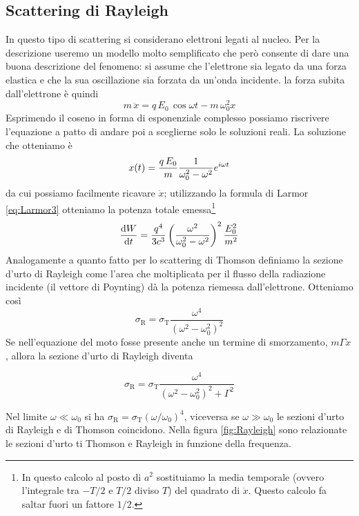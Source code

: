 \subsection{Scattering di Rayleigh}
In questo tipo di scattering si considerano elettroni legati al nucleo. Per la descrizione useremo un modello molto semplificato che però consente di dare una buona descrizione del fenomeno: si assume che l'elettrone sia legato da una forza elastica e che la sua oscillazione sia forzata da un'onda incidente. la forza subita dall'elettrone è quindi
\begin{equation}
m\,\ddot{x} = q\,E_0\,\cos\omega t - m\, \omega_0^2 x
\end{equation}
Esprimendo il coseno in forma di esponenziale complesso possiamo riscrivere l'equazione a patto di andare poi a sceglierne solo le soluzioni reali. La soluzione che otteniamo è
\begin{equation}
x(t) = \dfrac{q\,E_0}{m} \dfrac{1}{\omega_0^2-\omega^2} e^{i\omega t}
\end{equation}
da cui possiamo facilmente ricavare $\ddot{x}$; utilizzando la formula di Larmor \ref{eq:Larmor3} otteniamo la potenza totale emessa\footnote{In questo calcolo al posto di $a^2$ sostituiamo la media temporale (ovvero l'integrale tra $-T/2$ e $T/2$ diviso $T$) del quadrato di $\ddot{x}$. Questo calcolo fa saltar fuori un fattore $1/2$.}
\begin{equation}
\dfrac{\mathrm{d} {W}}{\mathrm{d} {t}} = \dfrac{q^4}{3c^3}\left(\dfrac{\omega^2}{\omega_0^2-\omega^2}\right)^2 \dfrac{E_0^2}{m^2}
\end{equation}
Analogamente a quanto fatto per lo scattering di Thomson definiamo la sezione d'urto di Rayleigh come l'area che moltiplicata per il flusso della radiazione incidente (il vettore di Poynting) dà la potenza riemessa dall'elettrone. Otteniamo così
\begin{equation}
\sigma_\mathrm{R} = \sigma_\mathrm{T} \dfrac{\omega^4}{(\omega^2-\omega_0^2)^2}
\end{equation}
Se nell'equazione del moto fosse presente anche un termine di smorzamento, $m\Gamma\dot{x}$, allora la sezione d'urto di Rayleigh diventa
\begin{EQ}
\begin{equation}
\sigma_\mathrm{R} = \sigma_\mathrm{T} \dfrac{\omega^4}{(\omega^2-\omega_0^2)^2 + \Gamma^2}
\end{equation}
\end{EQ}
Nel limite $\omega\ll\omega_0$ si ha $\sigma_\mathrm{R} = \sigma_\mathrm{T} (\omega/\omega_0)^4$, viceversa se $\omega\gg\omega_0$ le sezioni d'urto di Rayleigh e di Thomson coincidono. Nella figura \ref{fig:Rayleigh} sono relazionate le sezioni d'urto ti Thomson e Rayleigh in funzione della frequenza.
